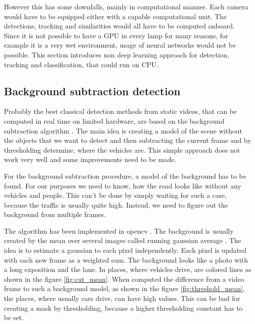 \documentclass[a4paper,12pt,titlepage]{article}
\numberwithin{figure}{section}
\begin{document}
However this has some downfalls, mainly in computational manner. Each camera would have to be equipped either with a capable computational unit. The detections, tracking and similarities would all have to be computed onboard. Since it is not possible to have a GPU in every lamp for many reasons, for example it is a very wet environment, usage of neural networks would not be possible. This section introduces non deep learning approach for detection, tracking and classification, that could run on CPU.



\subsection{Background subtraction detection}
\label{sec:bgs}

Probably the best classical detection methods from static videos, that can be computed in real time on limited hardware, are based on the background subtraction algorithm \cite{piccardi2004background}. The main idea is creating a model of the scene without the objects that we want to detect and then subtracting the current frame and by thresholding determine, where the vehicles are. This simple approach does not work very well and some improvements need to be made. 

For the background subtraction procedure, a model of the background has to be found. For our purposes we need to know, how the road looks like without any vehicles and people. This can't be done by simply waiting for such a case, because the traffic is usually quite high. Instead, we need to figure out the background from multiple frames. 

\cite{horprasert1999statistical, zivkovic2006efficient}

The algorithm has been implemented in opencv \cite{opencv}. The background is usually created by the mean over several images called running gaussian average \cite{wren1997pfinder}. The idea is to estimate a gaussian to each pixel independently. Each pixel is updated with each new frame as a weighted sum. The background looks like a photo with a long exposition and the lane. In places, where vehicles drive, are colored lines as shown in the figure \ref{fig:cut_mean}. When computed the difference from a video frame to such a background model, as shown in the figure \ref{fig:threshold_mean}, the places, where usually cars drive, can have high values. This can be bad for creating a mask by thresholding, because a higher thresholding constant has to be set.
\end{document}
